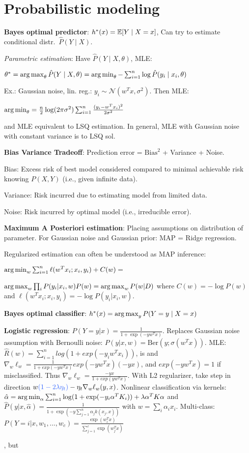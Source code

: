 \section{Probabilistic modeling}

\textbf{Bayes optimal predictor}: $h^*(x) = \mathbb{E}[Y \mid X = x]$, 
Can try to estimate conditional distr.\ $\hat{P}(Y\mid X)$.

\emph{Parametric estimation}: Have $\hat{P}(Y \mid X, \theta)$, MLE:

$\theta^* = \operatorname*{arg\,max}_\theta \hat{P}(Y \mid X, \theta) = \operatorname*{arg\,min}_\theta -\sum_{i=1}^n \log\hat{P}(y_i \mid x_i, \theta)$

Ex.: Gaussian noise, lin. reg.: $y_i \sim \mathcal{N}(w^T x, \sigma^2)$. Then MLE:

$\operatorname*{arg\,min}_\theta = \frac{n}{2} \log(2 \pi \sigma^2) \sum_{i=1}^n \frac{(y_i - w^T x_i)^2}{2 \sigma^2}$

and MLE equivalent to LSQ estimation. In general, MLE with Gaussian noise with constant variance is
 to LSQ sol.

\textbf{Bias Variance Tradeoff}: Prediction error = $\text{Bias}^2$ + Variance + Noise.

Bias: Excess risk of best model considered compared to minimal achievable risk knowing $P(X,Y)$ (i.e., given infinite data).

Variance: Risk incurred due to estimating model from limited data.

Noise: Risk incurred by optimal model (i.e., irreducible error).


\textbf{Maximum A Posteriori estimation}: Placing assumptions on distribution of
parameter. For Gaussian noise and Gaussian prior: MAP = Ridge regression.

Regularized estimation can often be understood as MAP inference: 

$\operatorname*{arg\,min}_w \sum_{i=1}^n \ell(w^T x_i; x_i, y_i) + C(w) = $

$\operatorname*{arg\,max}_w \prod_i P(y_i | x_i, w) P(w) = \operatorname*{arg\,max}_w P(w|D)$ where $C(w) = - \log P(w)$ and $\ell(w^T x_i; x_i, y_i) = - \log P(y_i | x_i, w)$.

\textbf{Bayes optimal classifier}: $h^*(x) = \operatorname*{arg\,max}_y P(Y = y \mid X = x)$

\textbf{Logistic regression}: $P(Y=y|x) = \frac{1}{1+\exp(-y w^T x)}$. Replaces Gaussian noise assumption with Bernoulli noise: $P(y|x,w)=\text{Ber}(y;\sigma(w^T x)).$
MLE:
$\hat{R}(w) = \sum_{i=1}^n log(1 + exp(-y_iw^Tx_i))$, is 
and $\nabla_w \ell_w = \frac{1}{1+exp(-yw^Tx)} exp(-yw^Tx) (-yx)$, and
$exp(-yw^Tx) = 1$ if misclassified. Thus $\nabla_w \ell_w =
\frac{-yx}{1+exp(yw^Tx)}$. With L2 regularizer, take step in direction
$w\blue{(1-2\lambda\eta_t)} - \eta_t \nabla_w \ell_w(y, x)$. Nonlinear classification via
kernels: $\hat{\alpha} = \operatorname*{arg\,min}_{\alpha} \sum_{i=1}^n \log (1+\exp(-y_i \alpha^T K_i)) + \lambda \alpha^T K \alpha$ and $\hat{P}(y | x, \hat{\alpha}) = \frac{1}{1+\exp(-y \sum_{j=1}^n \alpha_j k(x_j, x))}$ with $w = \sum_i \alpha_i x_i$. Multi-class: $P(Y = i | x,w_1,...,w_c) = \frac{\exp(w_i^T x)}{\sum_{j=1}^c \exp(w_j^T x)}$

, but 
